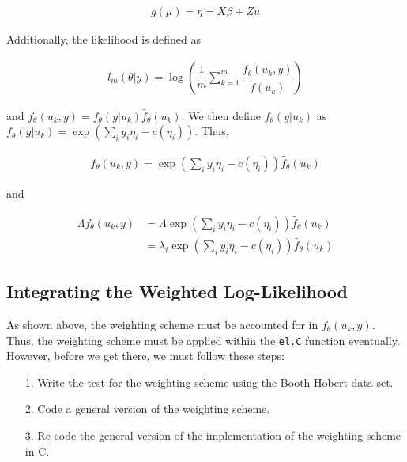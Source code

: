\documentclass{article}
\begin{document}
\begin{align}
g(\mu) = \eta = X\beta + Zu
\end{align}

\noindent Additionally, the likelihood is defined as 

\begin{align}
l_m(\theta|y) = \log \left( \dfrac{1}{m} \sum_{k=1}^m \dfrac{f_\theta(u_k,y)}{\tilde{f}(u_k)}
\right)
\end{align}

\noindent and $f_\theta(u_k, y) = f_\theta(y|u_k) \tilde{f_\theta} (u_k)$. We then define $f_\theta(y|u_k)$ as $f_\theta(y|u_k) = \exp \left( \sum_i y_i\eta_i - c(\eta_i) \right)$. Thus, 

\begin{align}
f_\theta (u_k, y) = \exp \left( \sum_i y_i \eta_i - c(\eta_i) \right) \tilde{f_\theta} (u_k)
\end{align}

and

\begin{align}
\Lambda f_\theta (u_k, y) &= \Lambda \exp \left( \sum_i y_i \eta_i - c(\eta_i) \right) \tilde{f_\theta} (u_k) \\
&= \lambda_i \exp \left( \sum_i y_i \eta_i - c(\eta_i) \right) \tilde{f_\theta} (u_k) 
\end{align}

\subsection{Integrating the Weighted Log-Likelihood}
As shown above, the weighting scheme must be accounted for in $f_\theta (u_k, y)$. Thus, the weighting scheme must be applied within the \texttt{el.C} function eventually. However, before we get there, we must follow these steps:

\begin{itemize}
	\item[1.] Write the test for the weighting scheme using the Booth Hobert data set.
	\item[2.] Code a general version of the weighting scheme.
	\item[3.] Re-code the general version of the implementation of the weighting scheme in C.
\end{itemize}
\end{document}
